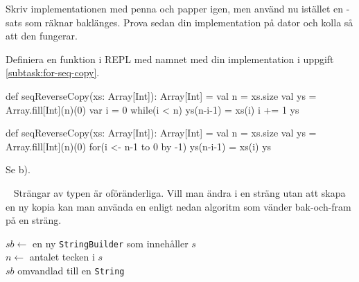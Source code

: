 \Subtask\Pen \label{subtask:for-seq-copy} Skriv implementationen med penna och papper igen, men använd nu istället en -sats som räknar baklänges. Prova sedan din implementation på dator och kolla så att den fungerar.

\Subtask Definiera en funktion i REPL med namnet  med din implementation i uppgift \ref{subtask:for-seq-copy}.


\SOLUTION


\TaskSolved \what


\SubtaskSolved  \begin{Code}
def seqReverseCopy(xs: Array[Int]): Array[Int] = {
  val n = xs.size
  val ys = Array.fill[Int](n)(0)
  var i = 0
  while(i < n) {
    ys(n-i-1) = xs(i)
    i += 1
  }
  ys
}
\end{Code}

\SubtaskSolved  \begin{Code}
def seqReverseCopy(xs: Array[Int]): Array[Int] = {
  val n = xs.size
  val ys = Array.fill[Int](n)(0)
  for(i <- n-1 to 0 by -1) ys(n-i-1) = xs(i)
  ys
}
\end{Code}

\SubtaskSolved  Se b).



\QUESTEND









\QUESTBEGIN

\Task  \what~  Strängar av typen  är oföränderliga. Vill man ändra i en sträng utan att skapa en ny kopia kan man använda en  enligt nedan algoritm som vänder bak-och-fram på en sträng.

\begin{algorithm}[H]

 $sb \leftarrow$ en ny \texttt{StringBuilder} som innehåller $s$ \\
 $n \leftarrow$ antalet tecken i $s$\\
 \Return $sb$ omvandlad till en \texttt{String}
\end{algorithm}

